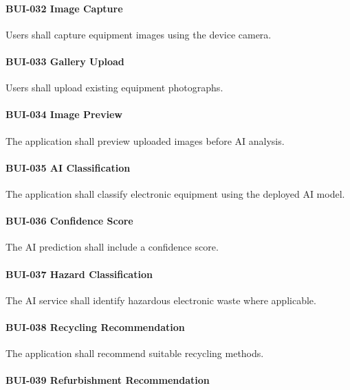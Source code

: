 \paragraph{BUI-032 Image Capture}

Users shall capture equipment images using the device camera.

\paragraph{BUI-033 Gallery Upload}

Users shall upload existing equipment photographs.

\paragraph{BUI-034 Image Preview}

The application shall preview uploaded images before AI analysis.

\paragraph{BUI-035 AI Classification}

The application shall classify electronic equipment using the deployed
AI model.

\paragraph{BUI-036 Confidence Score}

The AI prediction shall include a confidence score.

\paragraph{BUI-037 Hazard Classification}

The AI service shall identify hazardous electronic waste where
applicable.

\paragraph{BUI-038 Recycling Recommendation}

The application shall recommend suitable recycling methods.

\paragraph{BUI-039 Refurbishment Recommendation}

